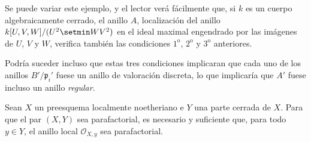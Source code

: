 \begin{env}[21.13.9]
Se puede variar este ejemplo, y el lector verá fácilmente que, si $k$ es un cuerpo
algebraicamente cerrado, el anillo $A$, localización del anillo
$k[U,V,W]/(U^2\setmin WV^2)$ en el ideal maximal engendrado por las imágenes de $U$, $V$ y $W$,
verifica también las condiciones $1^{\mathrm o}$, $2^{\mathrm o}$ y $3^{\mathrm o}$
anteriores.

Podría suceder incluso que estas tres condiciones implicaran que cada uno de los anillos
$B'/\mathfrak p_i'$ fuese un anillo de valoración discreta, lo que implicaría que
$A'$ fuese incluso un anillo \emph{regular}.
\end{env}

\begin{proposition}[21.13.10]
\label{IV.21.13.10}
Sean $X$ un preesquema localmente noetheriano e $Y$ una parte cerrada de $X$. Para que
el par $(X,Y)$ sea parafactorial, es necesario y suficiente que, para todo $y\in Y$,
el anillo local $\mathcal O_{X,y}$ sea parafactorial.
\end{proposition}

